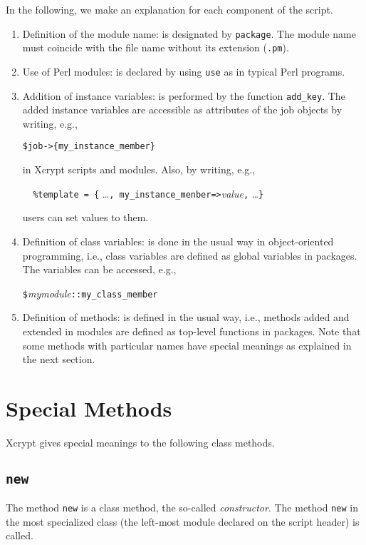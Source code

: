 \documentclass[a4paper,10pt]{report}
\def\|{\verb|} %|
\begin{document}
In the following, we make an explanation for each component of the script.
\begin{enumerate}
  \item Definition of the module name: is designated by \|package|.
	The module name must coincide with the file name
        without its extension (\|.pm|).
  \item Use of Perl modules: is declared by using \|use|
        as in typical Perl programs.
  \item Addition of instance variables: is performed by the function
	\|add_key|.  The added instance variables are accessible as
	attributes of the job objects by writing, e.g.,
	\begin{center}
	 \|$job->{my_instance_member}|
	\end{center}
	in Xcrypt scripts and modules.  Also, by writing, e.g.,
	\begin{center}
	 \|  |\|%
	\end{center}
	users can set values to them.
 \item Definition of class variables: is done in the usual way in
       object-oriented programming, i.e., class variables are defined
       as global variables in packages.  The variables can be
       accessed, e.g.,
	 \begin{center}
	  \|$|{\it mymodule}\|::my_class_member|
	 \end{center}
  \item Definition of methods: is defined in the usual way, i.e.,
	methods added and extended in modules are defined as top-level
	functions in packages.  Note that some methods with
	particular names have special meanings as explained in the next
	section.
\end{enumerate}

\section{Special Methods}

Xcrypt gives special meanings to the following class methods.

\subsection{\texttt{new}}

The method \texttt{new} is a class method, the so-called
\textit{constructor}.  The method \|new| in the most specialized class
(the left-most module declared on the script header) is called.
\end{document}
